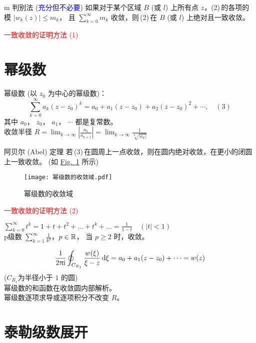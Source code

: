 \documentclass[12pt, a4paper, oneside, UTF8]{ctexbook}
\begin{document}
\begin{criterion}{m 判别法 \textcolor{blue}{(充分但不必要)}}{}
    如果对于某个区域 $B$ (或 $l$) 上所有点 $z$，(2)\,的各项的模 
    $\left\lvert w_k (z) \right\rvert \leqslant m_k$，
    且 $\sum_{k=0}^{\infty} m_k$ 收敛，则\,(2)\,在 $B$ (或 $l$) 上绝对且一致收敛。
\end{criterion}

\noindent {} \textcolor{red}{一致收敛的证明方法 (1)}

\section{幂级数} 
\noindent 幂级数 (以 $z_0$ 为中心的幂级数)：
\[\sum_{k=0}^{\infty} a_k (z-z_0)^k = a_0 + a_1 (z-z_0) + a_2 (z-z_0)^2 + \cdots, \quad (3)\]
其中 $a_0$， $z_0$， $a_1$， $\cdots$ 都是复常数。\\
收敛半径 $R = \lim_{k\to \infty} \left\lvert \frac{a_k}{a_{k+1}} \right\rvert 
= \lim_{k\to \infty} \frac{1}{\sqrt[k]{\left\lvert a_k \right\rvert}}$ 

\begin{them}{阿贝尔 (Abel) 定理}{}
    若\,(3)\,在圆周上一点收敛，则在圆内绝对收敛，在更小的闭圆上一致收敛。
    (如 \hyperref[fig:幂级数的收敛域]{Fig.~\ref{fig:幂级数的收敛域}} 所示)
\end{them}

\begin{figure}
    \centering
    \texttt{[image: 幂级数的收敛域.pdf]}
    \caption{\label{fig:幂级数的收敛域} 幂级数的收敛域}
\end{figure}
\noindent {} \textcolor{red}{一致收敛的证明方法 (2)}

\noindent {} $\sum_{k=0}^{\infty} t^k = 1 + t + t^2 + \dots + t^k + \dots = \frac{1}{1-t} 
\quad (\left\lvert t \right\rvert < 1)$\\
 p级数 $\sum_{k=1}^{\infty} \frac{1}{k^p}$，$p\in \mathbb{R}$，
当 $p\geqslant 2$ 时，收敛。

\[\frac{1}{2\uppi\mathrm{i}} \oint_{C_{R_1}}\frac{w(\xi)}{\xi-z}\mathop{}\!\mathrm{d} \xi 
= a_0 + a_1 (z-z_0) + \dots = w(z)\]
($C_{R_1} $为半径小于 $1$ 的圆)\\
幂级数的和函数在收敛圆内部解析。\\
幂级数逐项求导或逐项积分不改变 $R$。

\section{泰勒级数展开}
\end{document}
